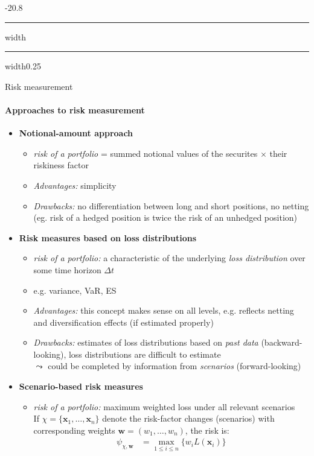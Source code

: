 \documentclass[a4paper,landscape,8pt,fleqn]{scrartcl}
\makeatletter
\renewcommand{\emph}[1]{\textbf{#1}}
\renewcommand{\subsection}{\@startsection{subsection}{1}{0mm}%
{-2\baselineskip}{0.8\baselineskip}%
{\hrule depth 0.2pt width\columnwidth\hrule depth0.75pt
width0.25\columnwidth\vspace*{1.2em}\large\bfseries}}
\makeatother
\begin{document}
\begin{multicols*}{3}
\subsection{Risk measurement}

\paragraph{Approaches to risk measurement}
\begin{itemize}
\item \emph{Notional-amount approach}
\begin{itemize}
\item \textit{risk of a portfolio} = summed notional values of the securites $\times$ their riskiness factor
\item \textit{Advantages:} simplicity
\item \textit{Drawbacks:} no differentiation between long and short positions, no netting (eg. risk of a hedged position is twice the risk of an unhedged position)
\end{itemize}
\item \emph{Risk measures based on loss distributions}
\begin{itemize}
\item \textit{risk of a portfolio:} a characteristic of the underlying \textit{loss distribution} over some time horizon $\Delta t$
\item e.g. variance, VaR, ES
\item \textit{Advantages:} this concept makes sense on all levels, e.g. reflects netting and diversification effects (if estimated properly)
\item \textit{Drawbacks:} estimates of loss distributions based on \textit{past data} (backward-looking), loss distributions are difficult to estimate \\
$\leadsto$ could be completed by information from \textit{scenarios} (forward-looking)
\end{itemize}
\item \emph{Scenario-based risk measures}
\begin{itemize}
\item \textit{risk of a portfolio:} maximum weighted loss under all relevant scenarios \\
If $\chi = \lbrace \bm x_1, \ldots, \bm x_n \rbrace$ denote the risk-factor changes (scenarios) with corresponding weights $\bm w = (w_1, \ldots, w_n)$, the risk is:
\begin{align*}
\psi_{\chi,\bm w} &= \max_{1 \leq i \leq n} \lbrace w_i L(\bm x_i) \rbrace \\

\end{align*}
\end{itemize}
\end{itemize}
\end{multicols*}
\end{document}
